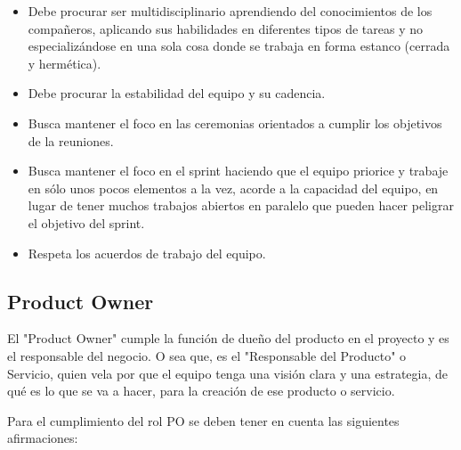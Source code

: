 \begin{itemize}
\item Debe procurar ser multidisciplinario aprendiendo del conocimientos de los compañeros, aplicando sus habilidades en diferentes tipos de tareas y no especializándose en una sola cosa donde se trabaja en forma estanco (cerrada y hermética).
\item Debe procurar la estabilidad del equipo y su cadencia.
\item Busca mantener el foco en las ceremonias orientados a cumplir los objetivos de la reuniones.
\item Busca mantener el foco en el sprint haciendo que el equipo priorice y trabaje en sólo unos pocos elementos a la vez, acorde a la capacidad del equipo, en lugar de tener muchos trabajos abiertos en paralelo que pueden hacer peligrar el objetivo del sprint.
\item Respeta los acuerdos de trabajo del equipo.
\end{itemize}

\subsection{Product Owner}

El "Product Owner" cumple la función de dueño del producto en el proyecto y es el responsable del negocio. O sea que, es el "Responsable del Producto" o Servicio, quien vela por que el equipo tenga una visión clara y una estrategia, de qué es lo que se va a hacer, para la creación de ese producto o servicio.

Para el cumplimiento del rol PO se deben tener en cuenta las siguientes afirmaciones:

